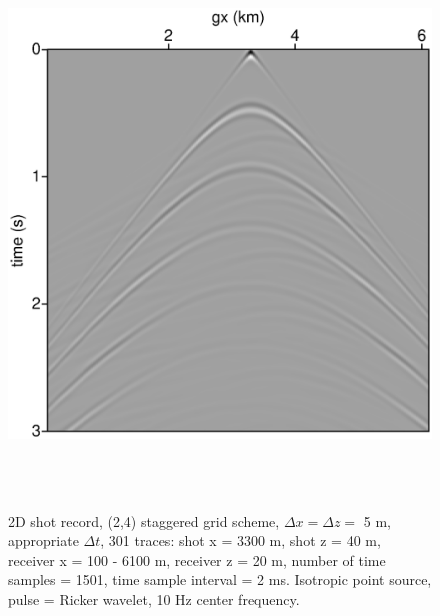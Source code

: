 \begin{figure}
\includegraphics[height=15cm,width=15cm]{./Fig/fig3.ps}
\caption{2D shot record, (2,4) staggered grid scheme, $\Delta x = \Delta z =$ 5 m,
  appropriate $\Delta t$, 301 traces: shot x = 3300 m, shot z = 40 m, receiver x =
 100 - 6100 m, receiver z = 20 m, number of time samples = 1501, time
sample interval = 2 ms. Isotropic point source, pulse = Ricker wavelet, 10 Hz center frequency.}
\label{fig:data5m}
\end{figure}

